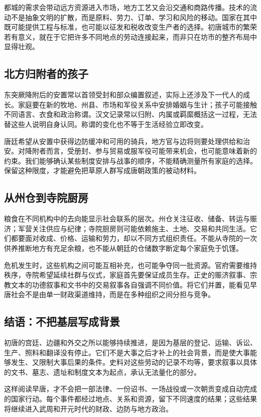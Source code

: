 都城的需求会带动远方资源进入市场，地方工艺又会沿交通和商路传播。技术的流动不是抽象文明的扩散，而是原料、劳力、订单、学习和风险的移动。国家在其中既可能提供工程与标准，也可能以征发和税收改变生产者的选择。初唐城市的繁荣若有意义，就在于它把许多不同地点的劳动连接起来，而非只在坊市的整齐布局中显得壮观。

\subsection{北方归附者的孩子}
东突厥降附后的安置常以首领受封和部众编置叙述，实际上还涉及下一代人的成长。家庭要在新的牧地、州县、市场和军役关系中安排婚姻与生计；孩子可能接触不同语言、衣食和政治称谓。汉文记录常以归附、内属或羁縻概括这一过程，无法替这些人说明自身认同。称谓的变化也不等于生活经验立即改变。

唐廷希望从安置中获得边防缓冲和可用的骑兵，地方官与边将则要处理供给和治安。对降附者而言，受册封、参与贸易或服军役可能带来机会，也可能意味着新的约束。我们能够确认某些制度安排与战事的顺序，不能精确测量所有家庭的选择。保留这种限度，才能避免把草原人群写成唐朝政策的被动材料。

\subsection{从州仓到寺院厨房}
粮食在不同机构中的去向能显示社会联系的层次。州仓关注征收、储备、转运与赈济；军营关注供应与纪律；寺院厨房则可能依赖施主、土地、交易和共同生活。它们都要面对收成、价格、运输和劳力，却以不同方式组织责任。不能从寺院的一次供养推断地方有充足余粮，也不能从朝廷的仓储数字断定每个家庭免于饥馑。

危机发生时，这些机构之间可能互相补充，也可能争夺同一批资源。官府需要维持秩序，寺院希望延续社群与仪式，家庭首先要保证成员生存。正史的赈济叙事、宗教文本的功德叙事和文书中的交易叙事各自强调不同价值。将它们并置，能看见早唐社会不是由单一财政渠道维持，而是在多种组织之间分担与竞争。

\subsection{结语：不把基层写成背景}
初唐的宫廷、边疆和外交之所以能够持续推进，是因为基层的登记、运输、诉讼、生产、照料和翻译没有停止。它们不是大事之后才补上的社会背景，而是使大事能够发生、又限制大事后果的条件。史料对这些劳动的记录不均等，要求叙事以具体的文书、墓志、遗址和制度文本为起点，承认无法量化的部分。

这样阅读早唐，才不会把一部法律、一份诏书、一场战役或一次朝贡变成自动完成的国家行动。每个事件都经过地点、关系和资源，留下不同速度的结果；这些结果将继续进入武周和开元时代的财政、边防与地方政治。
